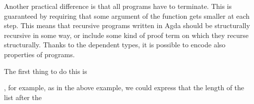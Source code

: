 Another practical difference is that all programs have to terminate. This is guaranteed by requiring that some argument of the function gets smaller at each step. This means that recursive programs written in Agda should be structurally recursive in some way, or include some kind of proof term on which they recurse structurally.
Thanks to the dependent types, it is possible to encode also properties of programs.

The first thing to do this is 

, for example, as in the above example, we could express that the length of the list after the 
